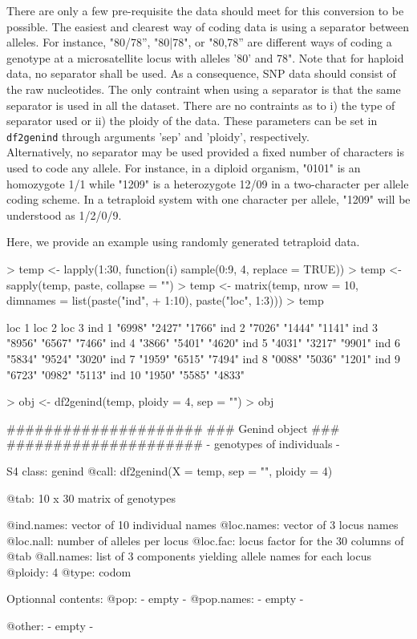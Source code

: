 \documentclass{article}
\begin{document}
There are only a few pre-requisite the data should meet for this conversion to be possible. The
easiest and clearest way of coding data is using a separator between alleles. For instance,
"80/78'', "80|78", or "80,78'' are different ways of coding a genotype at a microsatellite locus
with alleles '80' and 78".
Note that for haploid data, no separator shall be used.
As a consequence, SNP data should consist of the raw nucleotides.
The only contraint when using a separator is that the same separator is used in all the
dataset. There are no contraints as to i) the type of separator used or ii) the ploidy of the data.
These parameters can be set in \texttt{df2genind} through arguments 'sep' and 'ploidy', respectively.
\\

Alternatively, no separator may be used provided a fixed number of characters is used to code any allele.
For instance, in a diploid organism, "0101" is an homozygote 1/1 while "1209" is a heterozygote
12/09 in a two-character per allele coding scheme.
In a tetraploid system with one character per allele, "1209" will be understood as 1/2/0/9.

Here, we provide an example using randomly generated tetraploid data.
\begin{Schunk}
\begin{Sinput}
> temp <- lapply(1:30, function(i) sample(0:9, 4, replace = TRUE))
> temp <- sapply(temp, paste, collapse = "")
> temp <- matrix(temp, nrow = 10, dimnames = list(paste("ind", 
+     1:10), paste("loc", 1:3)))
> temp
\end{Sinput}
\begin{Soutput}
       loc 1  loc 2  loc 3 
ind 1  "6998" "2427" "1766"
ind 2  "7026" "1444" "1141"
ind 3  "8956" "6567" "7466"
ind 4  "3866" "5401" "4620"
ind 5  "4031" "3217" "9901"
ind 6  "5834" "9524" "3020"
ind 7  "1959" "6515" "7494"
ind 8  "0088" "5036" "1201"
ind 9  "6723" "0982" "5113"
ind 10 "1950" "5585" "4833"
\end{Soutput}
\begin{Sinput}
> obj <- df2genind(temp, ploidy = 4, sep = "")
> obj
\end{Sinput}
\begin{Soutput}
   #####################
   ### Genind object ### 
   #####################
- genotypes of individuals - 

S4 class:  genind
@call: df2genind(X = temp, sep = "", ploidy = 4)

@tab:  10 x 30 matrix of genotypes

@ind.names: vector of  10 individual names
@loc.names: vector of  3 locus names
@loc.nall: number of alleles per locus
@loc.fac: locus factor for the  30 columns of @tab
@all.names: list of  3 components yielding allele names for each locus
@ploidy:  4
@type:  codom

Optionnal contents: 
@pop:  - empty -
@pop.names:  - empty -

@other: - empty -
\end{Soutput}
\end{Schunk}
\end{document}
